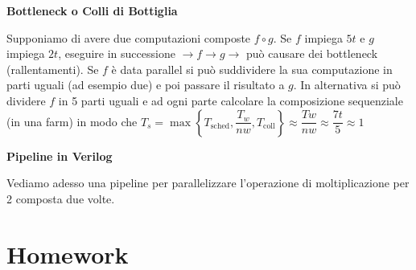 
\begin{defn}
	\textbf{Bottleneck o Colli di Bottiglia}
	
	Supponiamo di avere due computazioni composte $ f \circ g $. Se $ f $ impiega $ 5t $ e $ g $ impiega $ 2t $, eseguire in successione $ \to f \to g \to $ può causare dei bottleneck (rallentamenti). Se $ f $ è data parallel si può suddividere la sua computazione in parti uguali (ad esempio due) e poi passare il risultato a $ g $. In alternativa si può dividere $ f $ in 5 parti uguali e ad ogni parte calcolare la composizione sequenziale (in una farm) in modo che $ T_s = \max\left\{T_\text{sched}, \dfrac{T_w}{nw}, T_\text{coll}\right\} \approx \dfrac{Tw}{nw} \approx \dfrac{7t}{5} \approx 1$

\end{defn}

\begin{exmp}
	\textbf{Pipeline in Verilog}
	
	Vediamo adesso una pipeline per parallelizzare l'operazione di moltiplicazione per 2 composta due volte.
	
	
	
	
\end{exmp}

\section{Homework}

